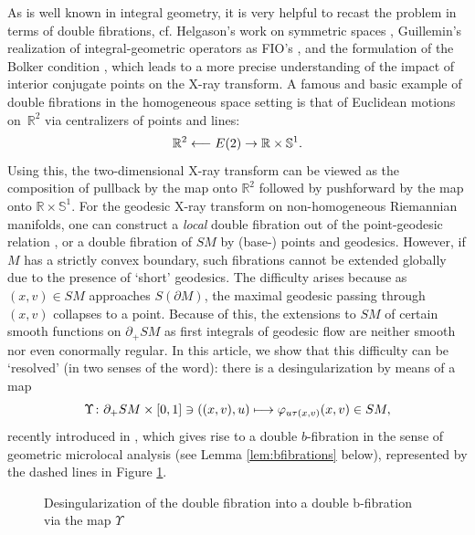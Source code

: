 \documentclass[11pt]{article}
\newcommand{\cf}{cf.\xspace}
\let\ts\textstyle
\def\mto{\mathchoice{\longmapsto}{\mapsto}{\mapsto}{\mapsto}}
\def\from{\mathchoice{\longleftarrow}{\leftarrow}{\leftarrow}{\leftarrow}}
\theoremstyle{plain}
\theoremstyle{definition}
\theoremstyle{remark}
\def\Sm{\mathbb{S}}
\def\Rm{{\mathbb{R}}}
\newcommand{\del}{\partial}
\newcommand{\foot}{{\pi_{\mathrm f}}}
\begin{document}
As is well known in integral geometry, it is very helpful to recast the problem in terms of double fibrations, \cf Helgason's work
on symmetric spaces \cite{Helgason2010}, Guillemin's realization of integral-geometric operators as FIO's \cite{Guillemin1979}, and
the formulation of the Bolker condition \cite{Monard2013b,Holman2015}, which leads to a more precise understanding of the impact
of interior conjugate points on the X-ray transform. A famous and basic example of double fibrations in the homogeneous space setting
is that of Euclidean motions on~$\Rm^2$ via centralizers of points and lines:
\begin{equation*}
\Rm^2 \from E(2) \to \Rm\times\Sm^1.
\end{equation*}
Using this, the two-dimensional X-ray transform can be viewed as the composition of pullback by the map onto $\Rm^2$ followed by
pushforward by the map onto $\Rm \times \Sm^1$. For the geodesic X-ray transform on non-homogeneous Riemannian manifolds,
one can construct a {\em local} double fibration out of the point-geodesic relation \cite{Monard2013b,Gelfand1969}, or a double fibration
of $SM$ by (base-) points and geodesics. However, if $M$ has a strictly convex boundary, such fibrations cannot be extended globally
due to the presence of `short' geodesics. The difficulty arises because as $(x,v)\in SM$ approaches $S(\partial M)$, the maximal geodesic
passing through $(x,v)$ collapses to a point. Because of this, the extensions to $SM$ of certain smooth functions on $\del_+ SM$
as first integrals of geodesic flow are neither smooth nor even conormally regular. In this article, we show that this difficulty
can be `resolved' (in two senses of the word): there is a desingularization by means of a map
\begin{equation}
\Upsilon \colon \partial_+ SM\times [0,1]\ni ((x,v) ,u) \mto \varphi_{u\tau(x,v)}(x,v) \in SM,
\label{eq:Upsilon}
\end{equation}
recently introduced in \cite{Monard2020a}, which gives rise to a double $b$-fibration in the sense of geometric microlocal
analysis \cite{Melrose1992,Grieser2001} (see Lemma \ref{lem:bfibrations} below), represented by the dashed lines in
Figure \ref{fig:doublefib}.
\begin{figure}[htpb]
\centering
{}
\caption{Desingularization of the double fibration into a double b-fibration via the map $\Upsilon$}
\label{fig:doublefib}
\end{figure}
\end{document}
